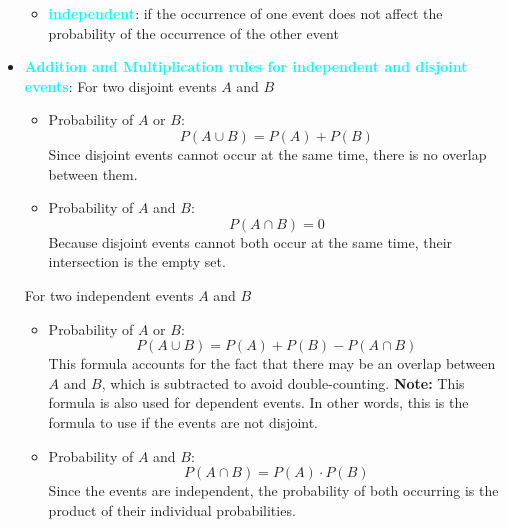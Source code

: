 \documentclass{report}
\begin{document}
\begin{itemize}
\begin{itemize}
                \item \textbf{\textcolor{cyan}{independent}}: if the occurrence of one event does not affect the probability of the occurrence of the other event
            \end{itemize}
        \item \textbf{\textcolor{cyan}{Addition and Multiplication rules for independent and disjoint events}}:
            \bigbreak \noindent 
            For two disjoint events $A$ and $B$
            \begin{itemize}
                \item Probability of \( A \) or \( B \):
                    \[
                        P(A \cup B) = P(A) + P(B)
                    \]
                    Since disjoint events cannot occur at the same time, there is no overlap between them.
                \item Probability of \( A \) and \( B \):
                    \[
                        P(A \cap B) = 0
                    \]
                    Because disjoint events cannot both occur at the same time, their intersection is the empty set.
            \end{itemize}
            \bigbreak \noindent 
            For two independent events $A$ and $B$
            \begin{itemize}
                \item Probability of \( A \) or \( B \):
                    \[
                        P(A \cup B) = P(A) + P(B) - P(A \cap B)
                    \]
                    This formula accounts for the fact that there may be an overlap between \( A \) and \( B \), which is subtracted to avoid double-counting.
                    \bigbreak \noindent 
                    \textbf{Note:} This formula is also used for dependent events. In other words, this is the formula to use if the events are not disjoint.
                \item Probability of \( A \) and \( B \):
                    \[
                        P(A \cap B) = P(A) \cdot P(B)
                    \]
                    Since the events are independent, the probability of both occurring is the product of their individual probabilities.


\end{itemize}
\end{itemize}
\end{document}

